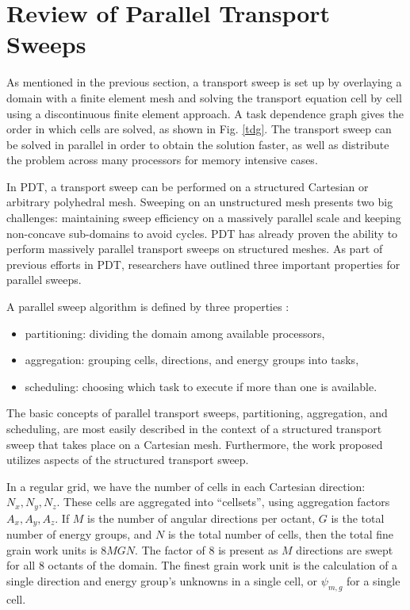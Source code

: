 \documentclass[11pt, letterpaper,titlepage,oneside]{article}
\begin{document}
\section{Review of Parallel Transport Sweeps}

As mentioned in the previous section, a transport sweep is set up by overlaying a domain with a finite element mesh and solving the transport equation cell by cell using a discontinuous finite element approach. A task dependence graph gives the order in which cells are solved, as shown in Fig. \ref{tdg}. The transport sweep can be solved in parallel in order to obtain the solution faster, as well as distribute the problem across many processors for memory intensive cases. 


In PDT, a transport sweep can be performed on a structured Cartesian or arbitrary polyhedral mesh. Sweeping on an unstructured mesh presents two big challenges: maintaining sweep efficiency on a massively parallel scale and keeping non-concave sub-domains to avoid cycles. PDT has already proven the ability to perform massively parallel transport sweeps on structured meshes. As part of previous efforts in PDT, researchers have outlined three important properties for parallel sweeps. 

A parallel sweep algorithm is defined by three properties\cite{mpadams2013} :
\begin{itemize}
\item partitioning: dividing the domain among available processors,
\item aggregation: grouping cells, directions, and energy groups into tasks,
\item scheduling: choosing which task to execute if more than one is available.
\end{itemize}

The basic concepts of parallel transport sweeps, partitioning, aggregation, and scheduling, are most easily described in the context of a structured transport sweep that takes place on a Cartesian mesh. Furthermore, the work proposed utilizes aspects of the structured transport sweep.

In a regular grid, we have the  number of cells in each Cartesian direction: $N_x, N_y, N_z$. These cells are aggregated into ``cellsets'', using aggregation factors $A_x, A_y, A_z$. If $M$ is the number of angular directions per octant, $G$ is the total number of energy groups, and $N$ is the total number of cells, then the total fine grain work units is $8MGN$. The factor of 8 is present as $M$ directions are swept for all 8 octants of the domain. The finest grain work unit is the calculation of a single direction and energy group's unknowns in a single cell, or $\psi_{m,g}$ for a single cell.
\end{document}
